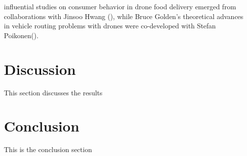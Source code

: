 \documentclass{article}
\begin{document}
influential studies on consumer behavior in drone food delivery emerged from collaborations with ​​Jinsoo Hwang (\cite{WOS:000514800800001, WOS:000605628800016, WOS:000623397300001})​​, while ​​Bruce Golden​​’s theoretical advances in vehicle routing problems with drones were co-developed with ​​Stefan Poikonen(\cite{WOS:000400384200003, WOS:000468604000010})​​.



\section{Discussion}
This section discusses the results

\section{Conclusion}
This is the conclusion section

\printbibliography
\end{document}
